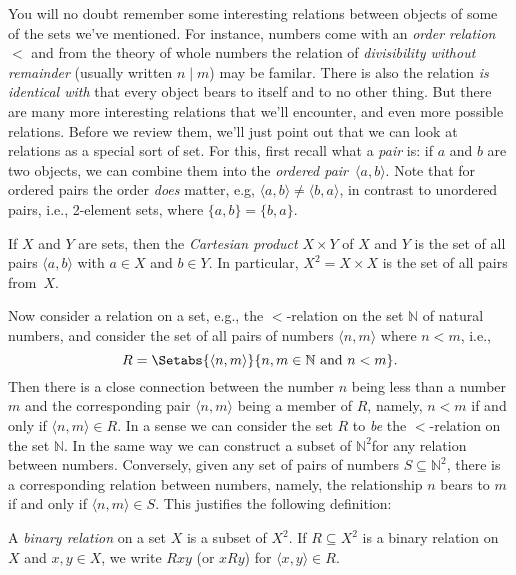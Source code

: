 \documentclass[../../include/open-logic-section]{subfiles}
\begin{document}

\begin{explain}
You will no doubt remember some interesting relations between objects of
some of the sets we've mentioned. For instance, numbers come with an
\emph{order relation}~$<$ and from the theory of whole numbers the
relation of \emph{divisibility without remainder} (usually written
$n\mid m$) may be familar. There is also the relation \emph{is
  identical with} that every object bears to itself and to no other
thing. But there are many more interesting relations that we'll
encounter, and even more possible relations. Before we review them,
we'll just point out that we can look at relations as a special sort
of set. For this, first recall what a \emph{pair} is: if $a$ and $b$
are two objects, we can combine them into the \emph{ordered
  pair}~$\langle a,b\rangle$.  Note that for ordered pairs the order
\emph{does} matter, e.g, $\langle a,b\rangle \neq \langle b,a\rangle$, 
in contrast to unordered pairs, i.e., 2-element sets, where
$\{a,b\}=\{b,a\}$.

If $X$ and $Y$ are sets, then the \emph{Cartesian product} $X\times Y$
of $X$ and $Y$ is the set of all pairs $\langle a,b\rangle$ with $a\in X$ and
$b\in Y$. In particular, $X^{2}=X\times X$ is the set of all pairs
from~$X$.

Now consider a relation on a set, e.g., the $<$-relation on the set
$\mathbb{N}$ of natural numbers, and consider the set of all pairs of
numbers $\langle n,m \rangle$ where $n<m$, i.e.,
\[
R=\Setabs{\langle n,m\rangle}{n,m\in\mathbb{N}\text{ and }n<m}.
\]
Then there is a close connection between the number $n$ being less
than a number $m$ and the corresponding pair $\langle n,m\rangle$
being a member of $R$, namely, $n<m$ if and only if $\langle n,m
\rangle\in R$. In a sense we can consider the set $R$ to \emph{be} the
$<$-relation on the set $\mathbb{N}$. In the same way we can construct
a subset of $\mathbb{N}^{2}$for any relation between
numbers. Conversely, given any set of pairs of numbers
$S\subseteq\mathbb{N}^{2}$, there is a corresponding relation between
numbers, namely, the relationship $n$ bears to $m$ if and only if
$\langle n,m \rangle\in S$. This justifies the following definition:
\end{explain}

\begin{defn}
A \emph{binary relation} on a set $X$ is a subset of $X^{2}$. If
$R\subseteq X^{2}$ is a binary relation on~$X$ and $x,y\in X$,
we write $Rxy$ (or $xRy$) for $\langle x,y \rangle\in R$.
\end{defn}
\end{document}
